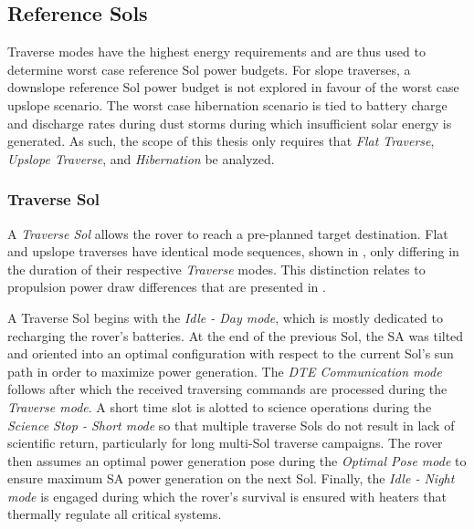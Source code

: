 

\subsection{Reference Sols}
\label{sec:ReferenceSols:ReferenceSols}
Traverse modes have the highest energy requirements and are thus used to determine worst case reference Sol power budgets. For slope traverses, a downslope reference Sol power budget is not explored in favour of the worst case upslope scenario. The worst case hibernation scenario is tied to battery charge and discharge rates during dust storms during which insufficient solar energy is generated. As such, the scope of this thesis only requires that \textit{Flat Traverse}, \textit{Upslope Traverse}, and \textit{Hibernation} be analyzed.


\subsubsection{Traverse Sol}
\label{sec:ReferenceSols:TraverseSol}
A \textit{Traverse Sol} allows the rover to reach a pre-planned target destination. Flat and upslope traverses have identical mode sequences, shown in , only differing in the duration of their respective \textit{Traverse} modes. This distinction relates to propulsion power draw differences that are presented in .



A Traverse Sol begins with the \textit{Idle - Day mode}, which is mostly dedicated to recharging the rover's batteries. At the end of the previous Sol, the \ac{SA} was tilted and oriented into an optimal configuration with respect to the current Sol's sun path in order to maximize power generation. The \textit{\ac{DTE} Communication mode}  follows after which the received traversing commands are processed during the \textit{Traverse mode}. A short time slot is alotted to science operations during the \textit{Science Stop - Short mode} so that multiple traverse Sols do not result in lack of scientific return, particularly for long multi-Sol traverse campaigns. The rover then assumes an optimal power generation pose during the \textit{Optimal Pose mode} to ensure maximum \ac{SA} power generation on the next Sol. Finally, the \textit{Idle - Night mode} is engaged during which the rover's survival is ensured with heaters that thermally regulate all critical systems.


